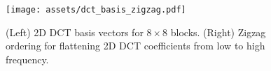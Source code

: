 \begin{figure}[t]
\centering
\texttt{[image: assets/dct\_basis\_zigzag.pdf]}
\caption{(Left) 2D DCT basis vectors for $8{\times}8$ blocks. (Right) Zigzag ordering for flattening 2D DCT coefficients from low to high frequency.}
\label{fig:dct_basis_zigzag}
\end{figure}